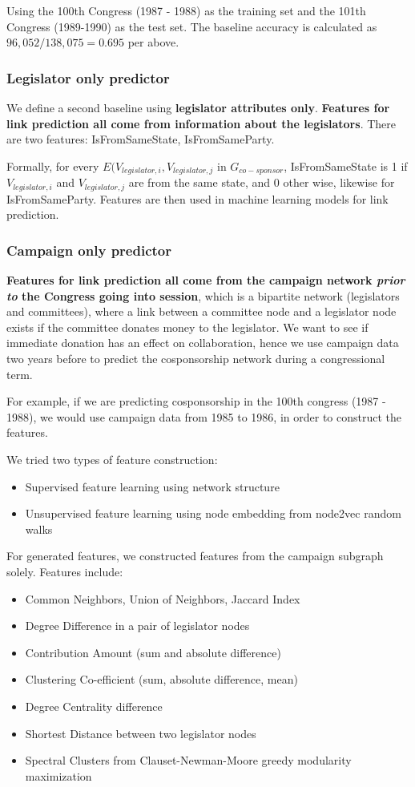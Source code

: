 \documentclass[12pt,twocolumn]{article}
\begin{document}
Using the 100th Congress (1987 - 1988) as the training set and the 101th Congress (1989-1990) as the test set.  The baseline accuracy is calculated as $96,052/138,075= 0.695$ per above. 

\subsubsection{Legislator only predictor}
We define a second baseline using \textbf{legislator attributes only}.  \textbf{Features for link prediction all come from information about the legislators}.  There are two features: IsFromSameState, IsFromSameParty.

Formally, for every $E(V_{legislator,i},V_{legislator,j}$ in $G_{co-sponsor}$, IsFromSameState is 1 if $V_{legislator,i}$ and $V_{legislator,j}$ are from the same state, and 0 other wise, likewise for IsFromSameParty.  
Features are then used in machine learning models for link prediction.

\subsubsection{Campaign only predictor}
\textbf{Features for link prediction all come from the campaign network \textit{prior to} the Congress going into session}, which is a bipartite network (legislators and committees), where a link between a committee node and a legislator node exists if the committee donates money to the legislator.  We want to see if immediate donation has an effect on collaboration, hence we use campaign data two years before to predict the cosponsorship network during a congressional term. 

For example, if we are predicting cosponsorship in the 100th congress (1987 - 1988), we would use campaign data from 1985 to 1986, in order to construct the features.

We tried two types of feature construction:
\begin{itemize}
    \item Supervised feature learning using network structure
    \item Unsupervised feature learning using node embedding from node2vec random walks
\end{itemize}

For generated features, we constructed features from the campaign subgraph solely. Features include: 
\begin{itemize}
\item Common Neighbors, Union of Neighbors, Jaccard Index
\item Degree Difference in a pair of legislator nodes
\item Contribution Amount (sum and absolute difference)
\item Clustering Co-efficient (sum, absolute difference, mean)
\item Degree Centrality difference
\item Shortest Distance between two legislator nodes
\item Spectral Clusters from Clauset-Newman-Moore greedy modularity maximization
\end{itemize}
\end{document}
